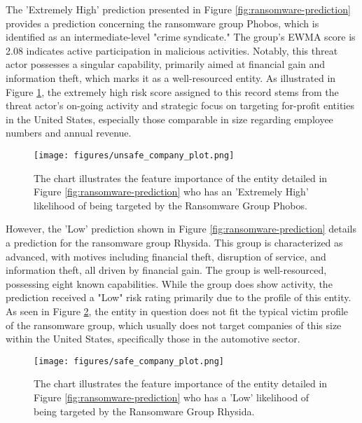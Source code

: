 \documentclass[running heads]{llncs}
\begin{document}
The 'Extremely High' prediction presented in Figure \ref{fig:ransomware-prediction} provides a prediction concerning the ransomware group Phobos, which is identified as an intermediate-level "crime syndicate." The group's EWMA score is 2.08 indicates active participation in malicious activities. Notably, this threat actor possesses a singular capability, primarily aimed at financial gain and information theft, which marks it as a well-resourced entity. As illustrated in Figure \ref{fig:company_victim_output}, the extremely high risk score assigned to this record stems from the threat actor's on-going activity and strategic focus on targeting for-profit entities in the United States, especially those comparable in size regarding employee numbers and annual revenue.

\begin{figure}
  \captionsetup{
    belowskip=-8pt,
  }
  \centering
  \texttt{[image: figures/unsafe\_company\_plot.png]}%
\caption[Extremely High Prediction]{
The chart illustrates the feature importance of the entity detailed in Figure \ref{fig:ransomware-prediction} who has an 'Extremely High' likelihood of being targeted by the Ransomware Group Phobos.}
  \label{fig:company_victim_output}
\end{figure}

However, the 'Low' prediction shown in Figure \ref{fig:ransomware-prediction} details a prediction for the ransomware group Rhysida. This group is characterized as advanced, with motives including financial theft, disruption of service, and information theft, all driven by financial gain. The group is well-resourced, possessing eight known capabilities. While the group does show activity, the prediction received a "Low" risk rating primarily due to the profile of this entity. As seen in Figure \ref{fig:safe_victim_output}, the entity in question does not fit the typical victim profile of the ransomware group, which usually does not target companies of this size within the United States, specifically those in the automotive sector.


\begin{figure}
  \captionsetup{
    belowskip=-8pt,
  }
  \centering
  \texttt{[image: figures/safe\_company\_plot.png]}%
\caption[Low Prediction]{
The chart illustrates the feature importance of the entity detailed in Figure \ref{fig:ransomware-prediction} who has a 'Low' likelihood of being targeted by the Ransomware Group Rhysida.}  
\label{fig:safe_victim_output}
\end{figure}
\end{document}
